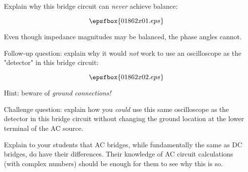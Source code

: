 

Explain why this bridge circuit can {\it never} achieve balance:

$$\epsfbox{01862x01.eps}$$







Even though impedance magnitudes may be balanced, the phase angles cannot.

\vskip 10pt

Follow-up question: explain why it would {\it not} work to use an oscilloscope as the "detector" in this bridge circuit:

$$\epsfbox{01862x02.eps}$$

Hint: beware of {\it ground connections!}

\vskip 10pt

Challenge question: explain how you {\it could} use this same oscilloscope as the detector in this bridge circuit without changing the ground location at the lower terminal of the AC source.







Explain to your students that AC bridges, while fundamentally the same as DC bridges, do have their differences.  Their knowledge of AC circuit calculations (with complex numbers) should be enough for them to see why this is so.




